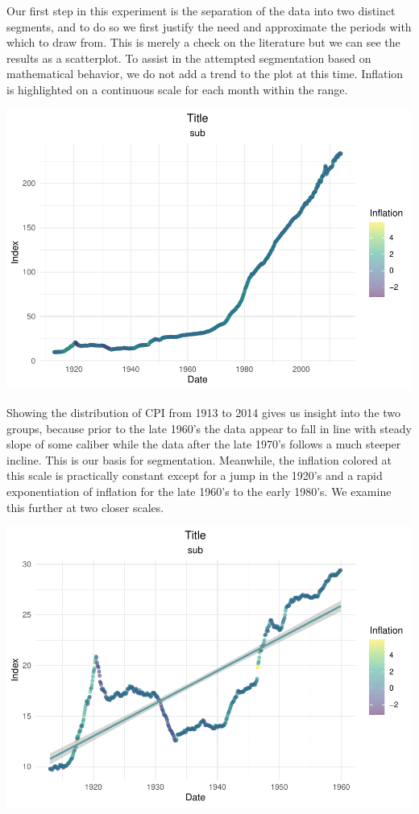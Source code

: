\documentclass[
]{article}
\begin{document}
Our first step in this experiment is the separation of the data into two
distinct segments, and to do so we first justify the need and
approximate the periods with which to draw from. This is merely a check
on the literature but we can see the results as a scatterplot. To assist
in the attempted segmentation based on mathematical behavior, we do not
add a trend to the plot at this time. Inflation is highlighted on a
continuous scale for each month within the range.

\includegraphics{CPIAnalysis_files/figure-latex/unnamed-chunk-4-1.pdf}

Showing the distribution of CPI from 1913 to 2014 gives us insight into
the two groups, because prior to the late 1960's the data appear to fall
in line with steady slope of some caliber while the data after the late
1970's follows a much steeper incline. This is our basis for
segmentation. Meanwhile, the inflation colored at this scale is
practically constant except for a jump in the 1920's and a rapid
exponentiation of inflation for the late 1960's to the early 1980's. We
examine this further at two closer scales.

\includegraphics{CPIAnalysis_files/figure-latex/unnamed-chunk-5-1.pdf}
\end{document}
